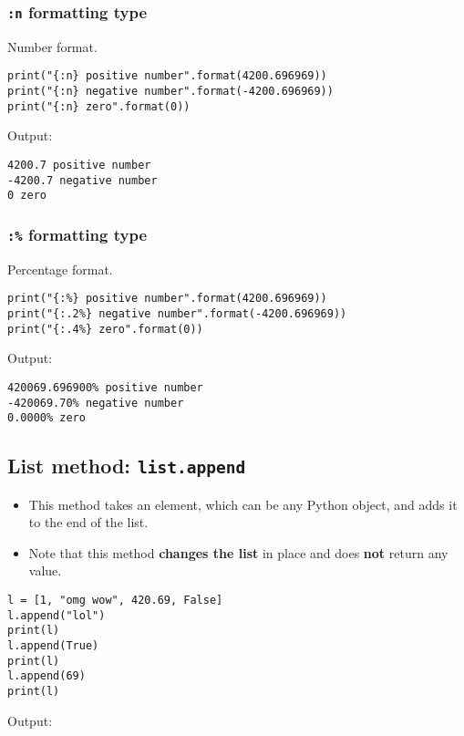 \documentclass[11pt]{article}
\begin{document}
\subsubsection{\texttt{:n} formatting type}
\label{sec:org55a26a4}
Number format.

\begin{verbatim}
print("{:n} positive number".format(4200.696969))
print("{:n} negative number".format(-4200.696969))
print("{:n} zero".format(0))
\end{verbatim}

 \noindent Output:

\begin{verbatim}
4200.7 positive number
-4200.7 negative number
0 zero
\end{verbatim}

\subsubsection{\texttt{:\%} formatting type}
\label{sec:org4e7bea6}
Percentage format.

\begin{verbatim}
print("{:%} positive number".format(4200.696969))
print("{:.2%} negative number".format(-4200.696969))
print("{:.4%} zero".format(0))
\end{verbatim}

 \noindent Output:

\begin{verbatim}
420069.696900% positive number
-420069.70% negative number
0.0000% zero
\end{verbatim}

\subsection{List method: \texttt{list.append}}
\label{sec:orgc8beaf6}
\begin{itemize}
\item This method takes an element, which can be any Python object, and adds it to the end of the list.
\item Note that this method \textbf{changes the list} in place and does \textbf{not} return any value.
\end{itemize}
\begin{verbatim}
l = [1, "omg wow", 420.69, False]
l.append("lol")
print(l)
l.append(True)
print(l)
l.append(69)
print(l)
\end{verbatim}

 \noindent Output:
\end{document}

